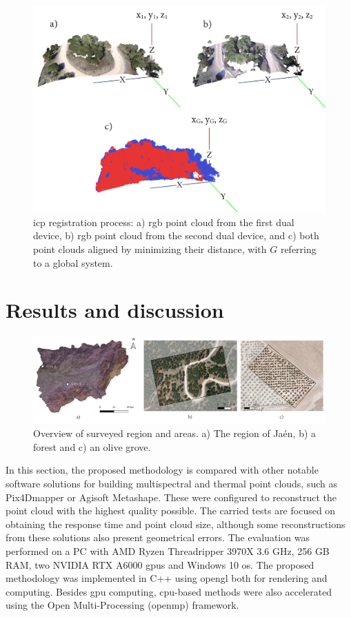 \begin{figure}[ht]
    \centering
    \includegraphics[width=\linewidth]{figs/multi_thermal_projection/ICP.png}
    \caption{\acrshort{icp} registration process: a) \acrshort{rgb} point cloud from the first dual device, b) \acrshort{rgb} point cloud from the second dual device, and c) both point clouds aligned by minimizing their distance, with $G$ referring to a global system.}
    \label{fig:icp}
\end{figure}

\section{Results and discussion}

\begin{figure}
    \centering
    \includegraphics[width=\linewidth]{figs/multi_thermal_projection/study area.png}
    \caption{Overview of surveyed region and areas. a) The region of Jaén, b) a forest and c) an olive grove. }
\label{fig:occlusion_study_area}
\end{figure}

In this section, the proposed methodology is compared with other notable software solutions for building multispectral and thermal point clouds, such as Pix4Dmapper or Agisoft Metashape. These were configured to reconstruct the point cloud with the highest quality possible. The carried tests are focused on obtaining the response time and point cloud size, although some reconstructions from these solutions also present geometrical errors. The evaluation was performed on a PC with AMD Ryzen Threadripper 3970X 3.6 GHz, 256 GB RAM, two NVIDIA RTX A6000 \acrshort{gpu}s and Windows 10 \acrshort{os}. The proposed methodology was implemented in C++ using \acrshort{opengl} both for rendering and computing. Besides \acrshort{gpu} computing, \acrshort{cpu}-based methods were also accelerated using the Open Multi-Processing (\acrshort{openmp}) framework.

